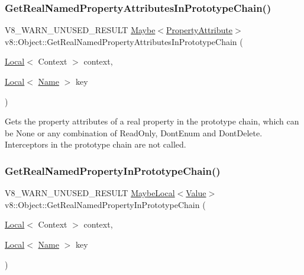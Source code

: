 \subsubsection{\texorpdfstring{Get\+Real\+Named\+Property\+Attributes\+In\+Prototype\+Chain()}{GetRealNamedPropertyAttributesInPrototypeChain()}}
{\footnotesize\ttfamily V8\+\_\+\+W\+A\+R\+N\+\_\+\+U\+N\+U\+S\+E\+D\+\_\+\+R\+E\+S\+U\+LT \mbox{\hyperlink{classv8_1_1Maybe}{Maybe}}$<$\mbox{\hyperlink{namespacev8_a05f25f935e108a1ea2d150e274602b87}{Property\+Attribute}}$>$ v8\+::\+Object\+::\+Get\+Real\+Named\+Property\+Attributes\+In\+Prototype\+Chain (\begin{DoxyParamCaption}\item[{\mbox{\hyperlink{classv8_1_1Local}{Local}}$<$ Context $>$}]{context,  }\item[{\mbox{\hyperlink{classv8_1_1Local}{Local}}$<$ \mbox{\hyperlink{classv8_1_1Name}{Name}} $>$}]{key }\end{DoxyParamCaption})}

Gets the property attributes of a real property in the prototype chain, which can be None or any combination of Read\+Only, Dont\+Enum and Dont\+Delete. Interceptors in the prototype chain are not called. \mbox{\label{classv8_1_1Object_afe68d490fc41783e30126ca547b7fc90}} 
\subsubsection{\texorpdfstring{Get\+Real\+Named\+Property\+In\+Prototype\+Chain()}{GetRealNamedPropertyInPrototypeChain()}}
{\footnotesize\ttfamily V8\+\_\+\+W\+A\+R\+N\+\_\+\+U\+N\+U\+S\+E\+D\+\_\+\+R\+E\+S\+U\+LT \mbox{\hyperlink{classv8_1_1MaybeLocal}{Maybe\+Local}}$<$\mbox{\hyperlink{classv8_1_1Value}{Value}}$>$ v8\+::\+Object\+::\+Get\+Real\+Named\+Property\+In\+Prototype\+Chain (\begin{DoxyParamCaption}\item[{\mbox{\hyperlink{classv8_1_1Local}{Local}}$<$ Context $>$}]{context,  }\item[{\mbox{\hyperlink{classv8_1_1Local}{Local}}$<$ \mbox{\hyperlink{classv8_1_1Name}{Name}} $>$}]{key }\end{DoxyParamCaption})}

